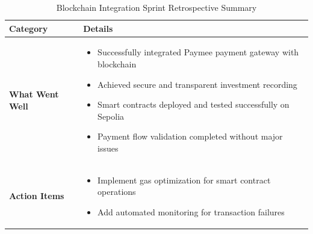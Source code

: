 \begin{table}[htbp]
    \centering
    \begin{tabular}{|p{3cm}|p{10cm}|}
        \hline
        \textbf{Category} & \textbf{Details} \\
        \hline
        \textbf{What Went Well} & 
        \begin{itemize}
            \item Successfully integrated Paymee payment gateway with blockchain
            \item Achieved secure and transparent investment recording
            \item Smart contracts deployed and tested successfully on Sepolia
            \item Payment flow validation completed without major issues
        \end{itemize} \\
        \hline
        \textbf{Action Items} & 
        \begin{itemize}
            \item Implement gas optimization for smart contract operations
            \item Add automated monitoring for transaction failures
        \end{itemize} \\
        \hline
    \end{tabular}
    \caption{Blockchain Integration Sprint Retrospective Summary}
    \label{tab:blockchain-retrospective}
\end{table}